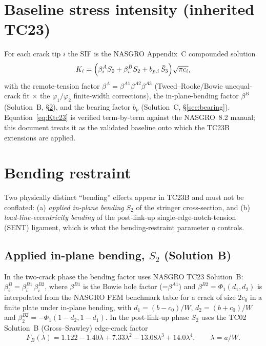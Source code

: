 \documentclass[11pt]{article}
\begin{document}
\section{Baseline stress intensity (inherited TC23)}

For each crack tip $i$ the SIF is the NASGRO Appendix~C compounded solution
\begin{equation}
K_i = \Bigl(\beta_i^{A} S_0 + \beta_i^{B} S_2 + b_{p,i}\,\bar S_3\Bigr)\sqrt{\pi c_i},
\label{eq:Ktc23}
\end{equation}
with the remote-tension factor $\beta^A = \beta^{A1}\beta^{A2}\beta^{A3}$
(Tweed--Rooke/Bowie unequal-crack fit $\times$ the $\varphi_1/\varphi_2$
finite-width corrections), the in-plane-bending factor $\beta^B$ (Solution~B,
\S\ref{sec:bend}), and the bearing factor $b_p$ (Solution~C, \S\ref{sec:bearing}).
Equation~\eqref{eq:Ktc23} is verified term-by-term against the NASGRO~8.2
manual; this document treats it as the validated baseline onto which the TC23B
extensions are applied.

\section{Bending restraint}
\label{sec:bend}

Two physically distinct ``bending'' effects appear in TC23B and must not be
conflated: (a) \emph{applied in-plane bending} $S_2$ of the stringer
cross-section, and (b) \emph{load-line-eccentricity bending} of the post-link-up
single-edge-notch-tension (SENT) ligament, which is what the bending-restraint
parameter $\eta$ controls.

\subsection{Applied in-plane bending, $S_2$ (Solution B)}
In the two-crack phase the bending factor uses NASGRO TC23 Solution~B:
$\beta_i^{B}=\beta_i^{B1}\,\beta_i^{B2}$, where $\beta^{B1}$ is the Bowie hole
factor (=$\beta^{A1}$) and $\beta^{B2}=\Phi_1(d_1,d_2)$ is interpolated from the
NASGRO FEM benchmark table for a crack of size $2c_0$ in a finite plate under
in-plane bending, with $d_1=(b-c_0)/W$, $d_2=(b+c_0)/W$ and
$\beta_2^{B2}=-\Phi_1(1-d_2,1-d_1)$. In the post-link-up phase $S_2$ uses the
TC02 Solution~B (Gross--Srawley) edge-crack factor
\begin{equation}
F_B(\lambda)=1.122-1.40\lambda+7.33\lambda^2-13.08\lambda^3+14.0\lambda^4,
\qquad \lambda=a/W .
\end{equation}
\end{document}
